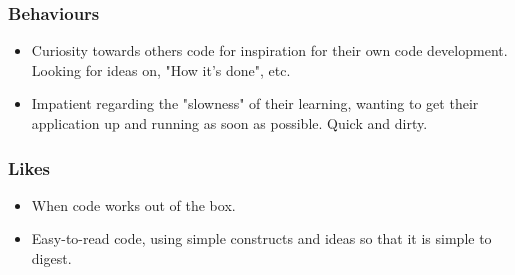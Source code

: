 \documentclass[11pt]{article}
\begin{document}
\subsubsection{Behaviours}

\begin{itemize}
\item Curiosity towards others code for inspiration for their own code
development. Looking for ideas on, "How it's done", etc.
\item Impatient regarding the "slowness" of their learning, wanting to
get their application up and running as soon as possible. Quick and
dirty.
\end{itemize}

\subsubsection{Likes}

\begin{itemize}
\item When code works out of the box.
\item Easy-to-read code, using simple constructs and ideas so that it
is simple to digest.
\end{itemize}
\end{document}
